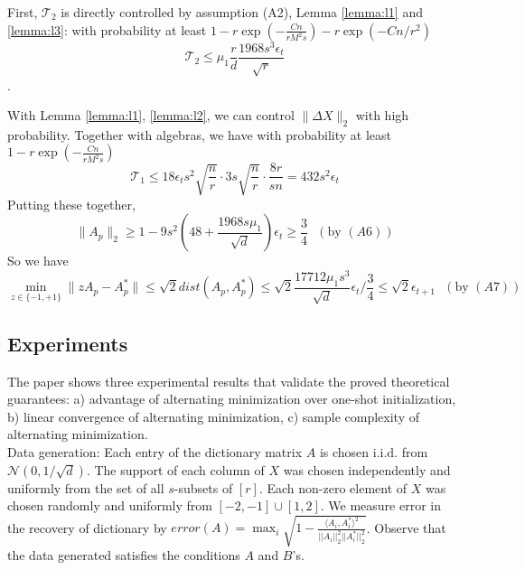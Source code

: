 First, $\mathcal{T}_2$ is directly controlled by assumption (A2), Lemma \ref{lemma:l1} and \ref{lemma:l3}: with probability at least $1-r\exp(-\frac{Cn}{rM^2s})-r\exp(-Cn/r^2)$
\begin{equation*}
    \mathcal{T}_2\leq \mu_1\frac{r}{d} \frac{1968s^3\epsilon_t}{\sqrt{r}}
\end{equation*}.

With Lemma \ref{lemma:l1}, \ref{lemma:l2}, we can control $\lVert \Delta X \rVert_2$ with high probability. Together with algebras, we have with probability at least $1-r\exp(-\frac{Cn}{rM^2s})$
\begin{equation*}
    \mathcal{T}_1\leq 18\epsilon_t s^2 \sqrt{\frac{n}{r}}\cdot 3s\sqrt{\frac{n}{r}}\cdot\frac{8r}{sn}=432s^2\epsilon_t
\end{equation*}
Putting these together,
\begin{equation*}
    \lVert A_p \rVert_2\geq 1-9s^2(48+\frac{1968s\mu_1}{\sqrt{d}})\epsilon_t \geq \frac{3}{4}~~~(\text{by } (A6))
\end{equation*}
So we have
\begin{equation*}
    \min_{z\in \{-1,+1\}}\lVert zA_p-A_p^* \rVert \leq \sqrt{2} dist(A_p,A_p^*)\leq \sqrt{2}\frac{17712\mu_1s^3}{\sqrt{d}}\epsilon_t/\frac{3}{4} \leq \sqrt{2}\epsilon_{t+1}~~~(\text{by }(A7))
\end{equation*}




\subsection{Experiments}

The paper shows three experimental results that validate the proved theoretical guarantees: a) advantage of alternating minimization over one-shot initialization, b) linear convergence of alternating minimization, c) sample complexity of alternating minimization. \\

Data generation: Each entry of the dictionary matrix $A$ is chosen i.i.d. from $\mathcal{N}(0, 1/\sqrt{d})$. The support of each column of $X$ was chosen independently and uniformly from the set of all $s$-subsets of $[r]$. Each non-zero element of $X$ was chosen randomly and uniformly from $[-2, -1] \cup [1, 2]$. We measure error in the recovery of dictionary by $error(A) = \max_i \sqrt{1-\frac{\langle A_i, A_i^* \rangle ^2}{||A_i||_2^2 ||A_i^*||_2^2}}$. Observe that the data generated satisfies the conditions $A$ and $B$'s.\\

